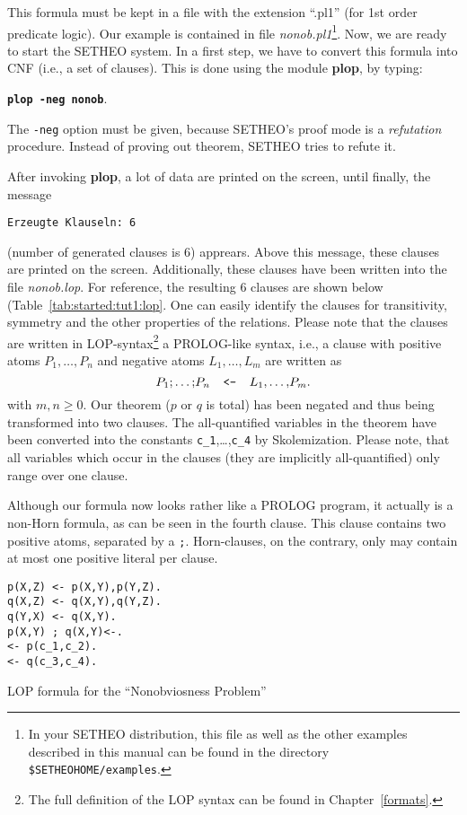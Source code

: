 This formula must be kept in a file with the extension ``.pl1''
(for 1st order predicate logic). Our example is contained in file
{\em nonob.pl1}\footnote{
	In your SETHEO distribution, this file as well as the other
	examples described in this manual can be found in the
	directory {\tt \$SETHEOHOME/examples}.}.
Now, we are ready to start the SETHEO system. In a first step, 
we have to convert this formula into CNF (i.e., a set of clauses).
This is done using the module {\bf plop}, by typing:
\begin{center}
{\bf\tt plop -neg nonob}.
\end{center}

The {\tt -neg} option must be given, because SETHEO's proof mode is
a {\em refutation\/} procedure. Instead of proving out theorem, 
SETHEO tries to refute it. 

After invoking {\bf plop},
a lot of data are printed on the screen, until finally, the message
\begin{center}
{\tt Erzeugte Klauseln: 6} 
\end{center}
(number of generated clauses is 6) apprears.
Above this message, these clauses are printed on the screen.
Additionally, these clauses have been written into the file
{\em nonob.lop}.
For reference, the resulting 6 clauses are shown below (Table~\ref{tab:started:tut1:lop}.
One can easily identify the clauses for transitivity, symmetry and the other
properties of the relations.
Please note that the clauses are written in LOP-syntax\footnote{
	The full definition of the LOP syntax can be found
	in Chapter~\ref{formats}.}
a PROLOG-like syntax, i.e., 
a clause with positive atoms $P_1,\ldots,P_n$ and negative atoms
$L_1,\ldots,L_m$ are written as
\[ P_1 {\tt ;} \ldots {\tt ;} P_n \mbox{\tt \ \ <-\ \ }
L_1 {\tt ,} \ldots {\tt ,} P_m{\tt .} \]
with $m,n \geq 0$.
Our theorem ($p$ or $q$ is total) has been negated and thus being
transformed into two clauses. The all-quantified variables in the 
theorem have been converted into the constants {\tt c\_1},\ldots,{\tt c\_4}
by Skolemization.
Please note, that all variables which occur in the clauses
(they are implicitly all-quantified) only range over one clause.

Although our formula now looks rather like a PROLOG program, it
actually is a non-Horn formula, as can be seen in the fourth clause.
This clause contains two positive atoms, separated by a {\tt ;}.
Horn-clauses, on the contrary, only may contain at most one
positive literal per clause.

\begin{table}[htb]
\begin{verbatim}
p(X,Z) <- p(X,Y),p(Y,Z).
q(X,Z) <- q(X,Y),q(Y,Z).
q(Y,X) <- q(X,Y).
p(X,Y) ; q(X,Y)<-.
<- p(c_1,c_2).
<- q(c_3,c_4).
\end{verbatim}
\caption{LOP formula for the ``Nonobviosness Problem''}
\label{tab:started:tut1:lop}
\end{table}

